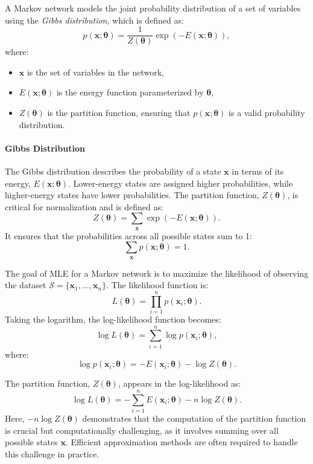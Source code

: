 A Markov network models the joint probability distribution of a set of variables using the \textit{Gibbs distribution}, which is defined as:
\[
p(\mathbf{x}; \bm{\theta}) = \frac{1}{Z(\bm{\theta})} \exp\left(-E(\mathbf{x}; \bm{\theta})\right),
\]
where:
\begin{itemize}
    \item $\mathbf{x}$ is the set of variables in the network,
    \item $E(\mathbf{x}; \bm{\theta})$ is the energy function parameterized by $\bm{\theta}$,
    \item $Z(\bm{\theta})$ is the partition function, ensuring that $p(\mathbf{x}; \bm{\theta})$ is a valid probability distribution.
\end{itemize}

\paragraph{Gibbs Distribution} The Gibbs distribution describes the probability of a state $\mathbf{x}$ in terms of its energy, $E(\mathbf{x}; \bm{\theta})$. Lower-energy states are assigned higher probabilities, while higher-energy states have lower probabilities. The partition function, $Z(\bm{\theta})$, is critical for normalization and is defined as:
\[
Z(\bm{\theta}) = \sum_{\mathbf{x}} \exp\left(-E(\mathbf{x}; \bm{\theta})\right).
\]
It ensures that the probabilities across all possible states sum to 1:
\[
\sum_{\mathbf{x}} p(\mathbf{x}; \bm{\theta}) = 1.
\]

The goal of MLE for a Markov network is to maximize the likelihood of observing the dataset $\mathcal{S} = \{\mathbf{x}_1, \ldots, \mathbf{x}_n\}$. The likelihood function is:
\[
L(\bm{\theta}) = \prod_{i=1}^n p(\mathbf{x}_i; \bm{\theta}).
\]
Taking the logarithm, the log-likelihood function becomes:
\[
\log L(\bm{\theta}) = \sum_{i=1}^n \log p(\mathbf{x}_i; \bm{\theta}),
\]
where:
\[
\log p(\mathbf{x}_i; \bm{\theta}) = -E(\mathbf{x}_i; \bm{\theta}) - \log Z(\bm{\theta}).
\]

The partition function, $Z(\bm{\theta})$, appears in the log-likelihood as:
\[
\log L(\bm{\theta}) = -\sum_{i=1}^n E(\mathbf{x}_i; \bm{\theta}) - n \log Z(\bm{\theta}).
\]
Here, $-n \log Z(\bm{\theta})$ demonstrates that the computation of the partition function is crucial but computationally challenging, as it involves summing over all possible states $\mathbf{x}$. Efficient approximation methods are often required to handle this challenge in practice.


